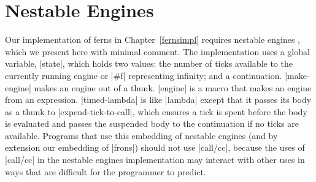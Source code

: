 \chapter{Nestable Engines}\label{nestable-engines}

Our implementation of ferns in Chapter~\ref{fernsimpl} requires
nestable engines \cite{RDybvi89,hieb94subcontinuations}, which we
present here with minimal comment.  The implementation uses a global
variable, \scheme|state|, which holds two values: the number of ticks
available to the currently running engine or \scheme|#f| representing
infinity; and a continuation. \scheme|make-engine| makes an engine out
of a thunk.  \scheme|engine| is a macro that makes an engine from an
expression.  \scheme|timed-lambda| is like \scheme|lambda| except that
it passes its body as a thunk to \scheme|expend-tick-to-call|, which
ensures a tick is spent before the body is evaluated and passes the
suspended body to the continuation if no ticks are available. Programs
that use this embedding of nestable engines (and by extension our
embedding of \scheme|frons|) should not use \scheme|call/cc|, because
the uses of \scheme|call/cc| in the nestable engines implementation
may interact with other uses in ways that are difficult for the
programmer to predict.

\schemedisplayspace
{}


